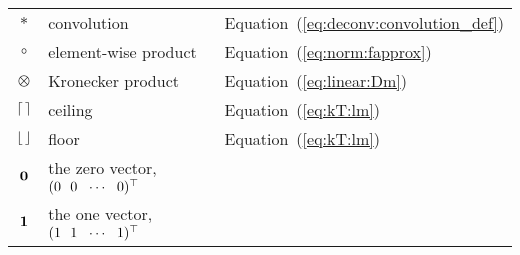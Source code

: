 \documentclass[modern]{aastex62}
\begin{document}
\begin{center}
\begin{longtable}{cll}
    $*$                      & convolution                                           & Equation~(\ref{eq:deconv:convolution_def})\\
    $\circ$                  & element-wise product                                  & Equation~(\ref{eq:norm:fapprox})\\
    $\otimes$                & Kronecker product                                     & Equation~(\ref{eq:linear:Dm})\\
    $\ceil*{\,}$             & ceiling                                               & Equation~(\ref{eq:kT:lm})\\
    $\floor*{\,}$            & floor                                                 & Equation~(\ref{eq:kT:lm})\\
    $\bvec{0}$               & the zero vector,     
                             $(0 \quadquad 0 \quadquad \cdots \quadquad 0)^\top$     & \\  
    $\bvec{1}$               & the one vector,     
                             $(1 \quadquad 1 \quadquad \cdots \quadquad 1)^\top$     & \\  

\end{longtable}
\end{center}

\clearpage

\end{document}
